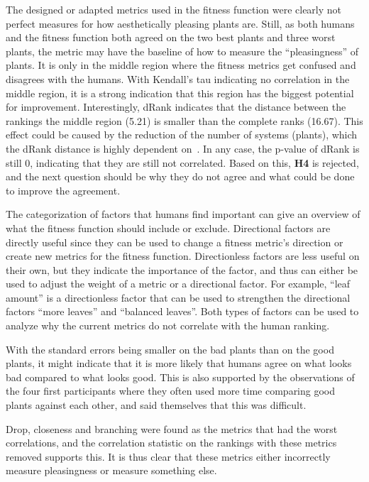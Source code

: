 The designed or adapted metrics used in the fitness function were clearly not perfect measures for how aesthetically pleasing plants are.
Still, as both humans and the fitness function both agreed on the two best plants and three worst plants, the metric may have the baseline of how to measure the ``pleasingness'' of plants.
It is only in the middle region where the fitness metrics get confused and disagrees with the humans.
With Kendall's tau indicating no correlation in the middle region, it is a strong indication that this region has the biggest potential for improvement.
Interestingly, dRank indicates that the distance between the rankings the middle region (5.21) is smaller than the complete ranks (16.67). %
This effect could be caused by the reduction of the number of systems (plants), which the dRank distance is highly dependent on~\cite{2009Carterette}.
In any case, the p-value of dRank is still 0, indicating that they are still not correlated.
Based on this, \textbf{H4} is rejected, and the next question should be why they do not agree and what could be done to improve the agreement.

The categorization of factors that humans find important can give an overview of what the fitness function should include or exclude.
Directional factors are directly useful since they can be used to change a fitness metric's direction or create new metrics for the fitness function.
Directionless factors are less useful on their own, but they indicate the importance of the factor, and thus can either be used to adjust the weight of a metric or a directional factor.
For example, ``leaf amount'' is a directionless factor that can be used to strengthen the directional factors ``more leaves'' and ``balanced leaves''.
Both types of factors can be used to analyze why the current metrics do not correlate with the human ranking.

With the standard errors being smaller on the bad plants than on the good plants, it might indicate that it is more likely that humans agree on what looks bad compared to what looks good.
This is also supported by the observations of the four first participants where they often used more time comparing good plants against each other, and said themselves that this was difficult.

Drop, closeness and branching were found as the metrics that had the worst correlations, and the correlation statistic on the rankings with these metrics removed supports this.
It is thus clear that these metrics either incorrectly measure pleasingness or measure something else.

